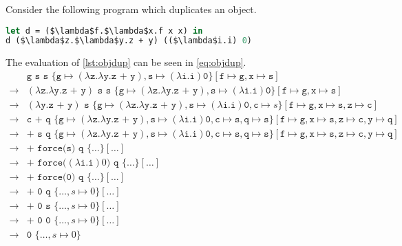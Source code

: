\documentclass[11pt,oneside,a4paper]{report}
\begin{document}
\begin{exmp}
Consider the following program which duplicates an object.
\begin{lstlisting}[language=ML,caption={Object duplication},label={lst:objdup},mathescape=true]
let d = ($\lambda$f.$\lambda$x.f x x) in
d ($\lambda$z.$\lambda$y.z + y) (($\lambda$i.i) 0)
\end{lstlisting}
The evaluation of \autoref{lst:objdup} can be seen in \autoref{eq:objdup}.
\begin{align}
    \label{eq:objdup}
    &\texttt{g s s }\{ \texttt{g} \mapsto (\lambda \texttt{z}.\lambda \texttt{y}.\texttt{z + y}), \texttt{s} \mapsto (\lambda\texttt{i}.\texttt{i}) \texttt{0} \}[\texttt{f} \mapsto \texttt{g}, \texttt{x} \mapsto \texttt{s}]\\
    \rightarrow &(\lambda \texttt{z}.\lambda \texttt{y}.\texttt{z + y})\texttt{ s s }\{ \texttt{g} \mapsto (\lambda \texttt{z}.\lambda \texttt{y}.\texttt{z + y}), \texttt{s} \mapsto (\lambda\texttt{i}.\texttt{i}) \texttt{0} \}[\texttt{f} \mapsto \texttt{g}, \texttt{x} \mapsto \texttt{s}]\tag*{}\\
    \rightarrow &(\lambda \texttt{y}.\texttt{z + y})\texttt{ s }\{ \texttt{g} \mapsto (\lambda \texttt{z}.\lambda \texttt{y}.\texttt{z + y}), \texttt{s} \mapsto (\lambda\texttt{i}.\texttt{i}) \texttt{0}, \texttt{c} \mapsto s \}[\texttt{f} \mapsto \texttt{g}, \texttt{x} \mapsto \texttt{s}, \texttt{z} \mapsto \texttt{c}]\tag*{}\\
    \rightarrow &\texttt{c + q }\{ \texttt{g} \mapsto (\lambda \texttt{z}.\lambda \texttt{y}.\texttt{z + y}), \texttt{s} \mapsto (\lambda\texttt{i}.\texttt{i}) \texttt{0}, \texttt{c} \mapsto \texttt{s}, \texttt{q} \mapsto \texttt{s}\}[\texttt{f} \mapsto \texttt{g}, \texttt{x} \mapsto \texttt{s}, \texttt{z} \mapsto \texttt{c}, \texttt{y} \mapsto \texttt{q}]\tag*{}\\
    \rightarrow &\texttt{+ s q }\{ \texttt{g} \mapsto (\lambda \texttt{z}.\lambda \texttt{y}.\texttt{z + y}), \texttt{s} \mapsto (\lambda\texttt{i}.\texttt{i}) \texttt{0}, \texttt{c} \mapsto \texttt{s}, \texttt{q} \mapsto \texttt{s}\}[\texttt{f} \mapsto \texttt{g}, \texttt{x} \mapsto \texttt{s}, \texttt{z} \mapsto \texttt{c}, \texttt{y} \mapsto \texttt{q}]\tag*{}\\
    \rightarrow &\texttt{+ force(s) q }\{ \dots \}[\dots]\tag*{}\\
    \rightarrow &\texttt{+ force(}(\lambda\texttt{i}.\texttt{i})0\texttt{) q } \{ \dots \}[\dots]\tag*{}\\
    \rightarrow &\texttt{+ force(0) q }\{ \dots \}[\dots]\tag*{}\\
    \rightarrow &\texttt{+ 0 q }\{ \dots, s \mapsto 0 \}[\dots]\tag*{}\\
    \rightarrow &\texttt{+ 0 s }\{ \dots, s \mapsto 0 \}[\dots]\tag*{}\\
    \rightarrow &\texttt{+ 0 0 }\{ \dots, s \mapsto 0 \}[\dots]\tag*{}\\
    \rightarrow &\texttt{0 }\{ \dots, s \mapsto 0 \}\tag*{}
\end{align}
\end{exmp}
\end{document}
